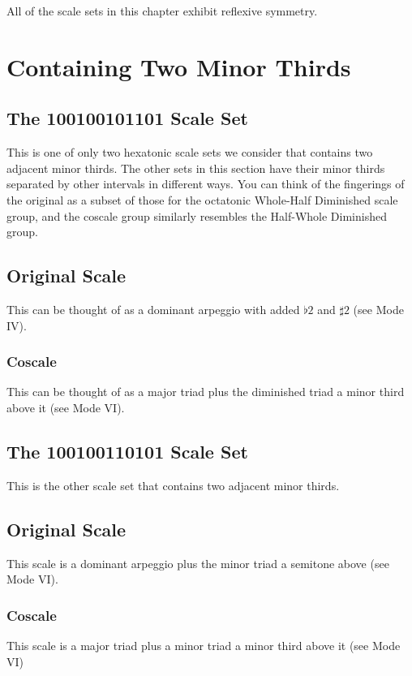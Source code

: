 \documentclass[english]{./gbook}
\begin{document}
\begin{large}
All of the scale sets in this chapter exhibit reflexive symmetry.

\section{Containing Two Minor Thirds}

\subsection{The 100100101101 Scale Set}
This is one of only two hexatonic scale sets we consider that contains two adjacent minor thirds. The other sets in this section have their minor thirds separated by other intervals in different ways. You can think of the fingerings of the original as a subset of those for the octatonic Whole-Half Diminished scale group, and the coscale group similarly resembles the Half-Whole Diminished group.
\subsection*{Original Scale}
This can be thought of as a dominant arpeggio with added $\flat2$ and $\sharp2$ (see Mode IV).
\subsubsection*{Coscale}
This can be thought of as a major triad plus the diminished triad a minor third above it (see Mode VI).

\subsection{The 100100110101 Scale Set}
This is the other scale set that contains two adjacent minor thirds. 
\subsection*{Original Scale}
This scale is a dominant arpeggio plus the minor triad a semitone above (see Mode VI).
\subsubsection*{Coscale}
This scale is a major triad plus a minor triad a minor third above it (see Mode VI)


\end{large}
\end{document}
